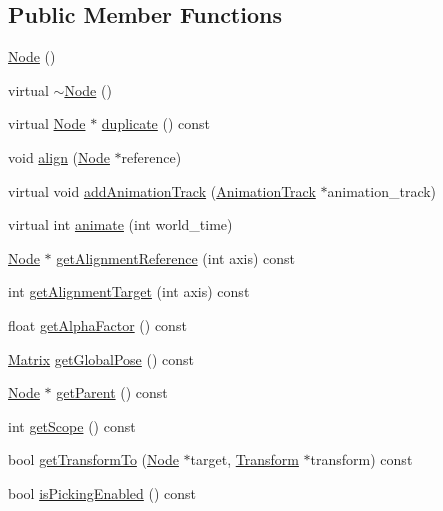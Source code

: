 \subsection*{Public Member Functions}
\begin{CompactItemize}
\item 
\hyperlink{classm3g_1_1Node_0d313fac56abd7ebe58a17f1530b879e}{Node} ()
\item 
virtual \hyperlink{classm3g_1_1Node_6fa6bf60f34f1e3efb0e59333428c9c8}{$\sim$Node} ()
\item 
virtual \hyperlink{classm3g_1_1Node}{Node} $\ast$ \hyperlink{classm3g_1_1Node_0b9f7531a4b56d34f47aeb1fff0d37e0}{duplicate} () const 
\item 
void \hyperlink{classm3g_1_1Node_3db1b4be060fe3d4f3dbf9720ef85234}{align} (\hyperlink{classm3g_1_1Node}{Node} $\ast$reference)
\item 
virtual void \hyperlink{classm3g_1_1Node_415c0b110f95410ded9b85e5d99a496b}{addAnimationTrack} (\hyperlink{classm3g_1_1AnimationTrack}{AnimationTrack} $\ast$animation\_\-track)
\item 
virtual int \hyperlink{classm3g_1_1Node_8aad1ceab4c2a03609c8a42324ce484d}{animate} (int world\_\-time)
\item 
\hyperlink{classm3g_1_1Node}{Node} $\ast$ \hyperlink{classm3g_1_1Node_ca338390bd2dee287fe6f5cbc4e094e1}{getAlignmentReference} (int axis) const 
\item 
int \hyperlink{classm3g_1_1Node_e5bbf42b3d88193fda0b476e1b1da009}{getAlignmentTarget} (int axis) const 
\item 
float \hyperlink{classm3g_1_1Node_bf7e8f9d9f530274aaf27e69910f8689}{getAlphaFactor} () const 
\item 
\hyperlink{classm3g_1_1Matrix}{Matrix} \hyperlink{classm3g_1_1Node_b50dd3f0331a71cf820bbd1edc894ef0}{getGlobalPose} () const 
\item 
\hyperlink{classm3g_1_1Node}{Node} $\ast$ \hyperlink{classm3g_1_1Node_ce26c2757f265bc6038e6818d2eb6ad9}{getParent} () const 
\item 
int \hyperlink{classm3g_1_1Node_a3c291c19cf805338fa4ad3c3deb663a}{getScope} () const 
\item 
bool \hyperlink{classm3g_1_1Node_206a2e95eb7db42e6880414f77858113}{getTransformTo} (\hyperlink{classm3g_1_1Node}{Node} $\ast$target, \hyperlink{classm3g_1_1Transform}{Transform} $\ast$transform) const 
\item 
bool \hyperlink{classm3g_1_1Node_b3187e5056afa4a94af03e34125c86b1}{isPickingEnabled} () const 
\item 

\end{CompactItemize}

